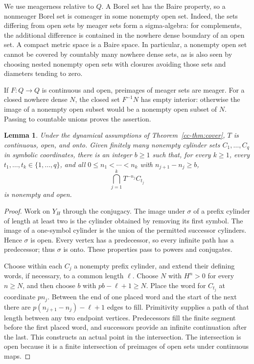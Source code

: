 \documentclass[11pt,reqno]{amsart}
\numberwithin{equation}{section}
\newtheorem{lemma}[theorem]{Lemma}
\theoremstyle{definition}
\begin{document}
We use meagerness relative to $Q$. A Borel set has the Baire property,
so a nonmeager Borel set is comeager in some nonempty open set. Indeed,
the sets differing from open sets by meager sets form a sigma-algebra:
for complements, the additional difference is contained in the
nowhere dense boundary of an open set. A compact metric space is a
Baire space. In particular, a nonempty open set cannot be covered by
countably many nowhere dense sets, as is also seen by choosing nested
nonempty open sets with closures avoiding those sets and diameters
tending to zero.

If $F:Q\to Q$ is continuous and open, preimages of meager sets are
meager. For a closed nowhere dense $N$, the closed set $F^{-1}N$ has
empty interior: otherwise the image of a nonempty open subset would be
a nonempty open subset of $N$. Passing to countable unions proves the
assertion.

\begin{lemma}\label{cc-lem:glue}
Under the dynamical assumptions of Theorem~\ref{cc-thm:cover}, $T$ is
continuous, open, and onto. Given finitely many nonempty cylinder sets
$C_1,\ldots,C_q$ in symbolic coordinates, there is an integer $b\ge1$
such that, for every $k\ge1$, every $t_1,\ldots,t_k\in\{1,\ldots,q\}$,
and all $0\le n_1<\cdots<n_k$ with $n_{j+1}-n_j\ge b$,
\[
 \bigcap_{j=1}^k T^{-n_j}C_{t_j}
\]
is nonempty and open.
\end{lemma}
\begin{proof}
Work on $Y_H$ through the conjugacy. The image under $\sigma$ of a
prefix cylinder of length at least two is the cylinder obtained by
removing its first symbol. The image of a one-symbol cylinder is the
union of the permitted successor cylinders. Hence $\sigma$ is open.
Every vertex has a predecessor, so every infinite path has a predecessor;
thus $\sigma$ is onto. These properties pass to powers and conjugates.

Choose within each $C_j$ a nonempty prefix cylinder, and extend their
defining words, if necessary, to a common length $\ell$. Choose $N$ with
$H^n>0$ for every $n\ge N$, and then choose $b$ with
$pb-\ell+1\ge N$. Place the word for $C_{t_j}$ at coordinate $pn_j$.
Between the end of one placed word and the start of the next there are
$p(n_{j+1}-n_j)-\ell+1$ edges to fill. Primitivity supplies a path of
that length between any two endpoint vertices. Predecessors fill the
finite segment before the first placed word, and successors provide an
infinite continuation after the last. This constructs an actual point
in the intersection. The intersection is open because it is a finite
intersection of preimages of open sets under continuous maps.
\end{proof}
\end{document}
